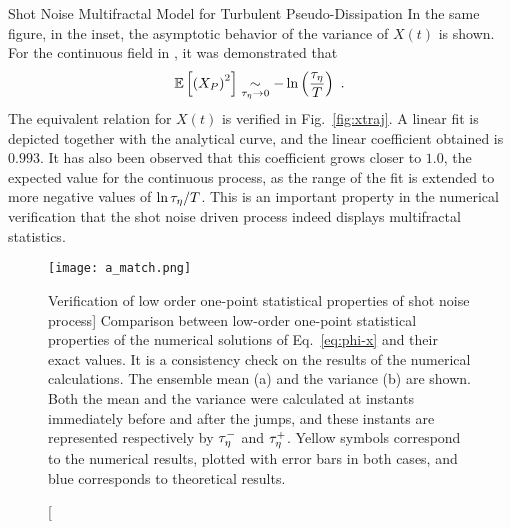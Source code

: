 \begin{chapter}{Shot Noise Multifractal Model for Turbulent Pseudo-Dissipation}
In the same figure, in the inset, the asymptotic behavior of the variance of $X(t)$ is shown. For the continuous field in \textcite{pereira2018multifractal}, it was demonstrated that
\begin{equation} \label{eq:lim-varx}
    \mathbb{E}\left[\left(X_P\right)^{2}\right] \underset{\tau_{\eta} \to 0}{\sim} -\ln \left(\frac{\tau_{\eta}}{T}\right) \ .
\end{equation}
The equivalent relation for $X(t)$ is verified in Fig.~\ref{fig:xtraj}.
A linear fit is depicted together with the analytical curve, and the linear coefficient obtained is $0.993$. It has also been observed that this coefficient grows closer to $1.0$, the expected value for the continuous process, as the range of the fit is extended to more negative values of $\ln \tau_{\eta}/T$. This is an important property in the numerical verification that the shot noise driven process indeed displays multifractal statistics.

\begin{figure}[ht]
    \centering
    \texttt{[image: a\_match.png]}
    \caption
    [Verification of low order one-point statistical properties of shot noise process]
    {Comparison between low-order one-point statistical properties of the numerical solutions of Eq.~\eqref{eq:phi-x} and their exact values. It is a consistency check on the results of the numerical calculations. The ensemble mean (a) and the variance (b) are shown. Both the mean and the variance were calculated at instants immediately before and after the jumps, and these instants are represented respectively by $\tau_{\eta}^-$ and $\tau_{\eta}^+$.
    Yellow symbols correspond to the numerical results, plotted with error bars in both cases, and blue corresponds to theoretical results.
    }
    \label{fig:mean_var_match}
\end{figure}



\end{chapter}
